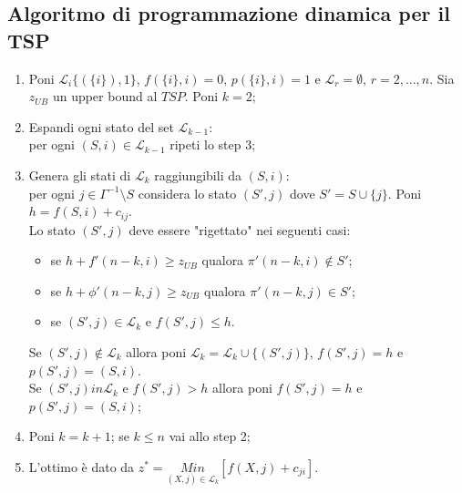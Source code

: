 \subsection{Algoritmo di programmazione dinamica per il TSP}
\begin{enumerate}
	\item Poni $\mathscr{L}_{i}\{(\{i\}),1\}$, $f(\{i\},i)=0$, $p(\{i\},i)=1$ e $\mathscr{L}_{r}=\emptyset$, $r=2,\dots,n$. Sia $z_{UB}$ un upper bound al $TSP$. Poni $k=2$;
	\item Espandi ogni stato del set $\mathscr{L}_{k-1}$:\\
	per ogni $(S,i)\in\mathscr{L}_{k-1}$ ripeti lo step 3;
	\item Genera gli stati di $\mathscr{L}_{k}$ raggiungibili da $(S,i)$:\\
	per ogni $j\in\Gamma^{-1}\setminus S$ considera lo stato $(S',j)$ dove $S'=S\cup\{j\}$. Poni $h=f(S,i)+c_{ij}$.\\
	Lo stato $(S',j)$ deve essere "rigettato" nei seguenti casi:
	\begin{itemize}
		\item se $h+f'(n-k,i)\ge z_{UB}$ qualora $\pi'(n-k,i)\notin S'$;
		\item se $h+\phi'(n-k,j)\ge z_{UB}$ qualora $\pi'(n-k,j)\in S'$;
		\item se $(S',j)\in\mathscr{L}_{k}$ e $f(S',j)\le h$.
	\end{itemize}
	Se $(S',j)\notin\mathscr{L}_{k}$ allora poni $\mathscr{L}_{k}=\mathscr{L}_{k}\cup\{(S',j)\}$, $f(S',j)=h$ e $p(S',j)=(S,i)$.\\
	Se $(S',j)in\mathscr{L}_{k}$ e $f(S',j)>h$ allora poni $f(S',j)=h$ e $p(S',j)=(S,i)$;
	\item Poni $k=k+1$; se $k\le n$ vai allo step 2;
	\item L'ottimo è dato da $z^{*}=\underset{(X,j)\in\mathscr{L}_{k}}{Min}[f(X,j)+c_{ji}]$.
\end{enumerate}
